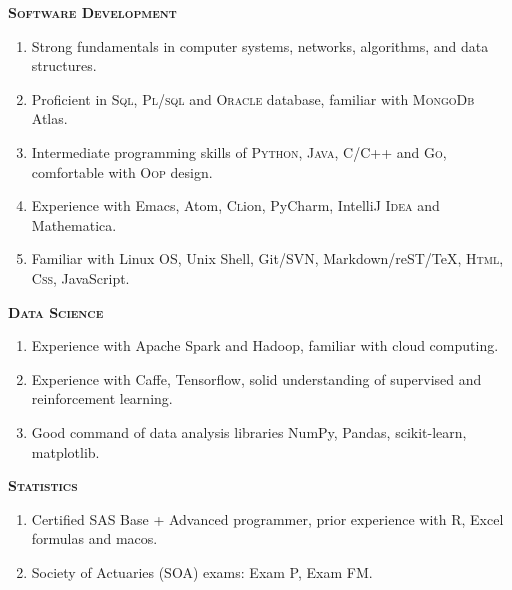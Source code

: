 \documentclass[11pt]{article}
\begin{document}
\vspace{1mm}
\textbf{\textsc{Software Development}}
\begin{enumerate}[leftmargin=*, topsep=-2mm, itemsep=-2mm]
  \item[\textbullet] Strong fundamentals in computer systems, networks, algorithms, and data structures.
  \item[\textbullet] Proficient in \textsc{Sql}, \textsc{Pl/sql} and \textsc{Oracle} database, familiar with \textsc{MongoDb} Atlas.
  \item[\textbullet] Intermediate programming skills of \textsc{Python, Java, C/C++} and \textsc{Go}, comfortable with \textsc{Oop} design.
  \item[\textbullet] Experience with Emacs, Atom, \textsc{Cl}ion, Py{\small C}harm, IntelliJ \textsc{Idea} and Mathematica.
  \item[\textbullet] Familiar with Linux OS, Unix Shell, Git/SVN, Markdown/reST/TeX, \textsc{Html}, \textsc{Css}, JavaScript.
\end{enumerate}

\vspace{1mm}
\textbf{\textsc{Data Science}}
\begin{enumerate}[leftmargin=*, topsep=-2mm, itemsep=-2mm]
  \item[\textbullet] Experience with Apache Spark and Hadoop, familiar with cloud computing.
  \item[\textbullet] Experience with Caffe, Tensorflow, solid understanding of supervised and reinforcement learning.
  \item[\textbullet] Good command of data analysis libraries NumPy, Pandas, scikit-learn, matplotlib.
\end{enumerate}

\vspace{1mm}
\textbf{\textsc{Statistics}}
\begin{enumerate}[leftmargin=*, topsep=-2mm, itemsep=-2mm]
  \item[\textbullet] Certified SAS Base + Advanced programmer, prior experience with R, Excel formulas and macos.
  \item[\textbullet] Society of Actuaries (SOA) exams: Exam P, Exam FM.
\end{enumerate}
\end{document}

